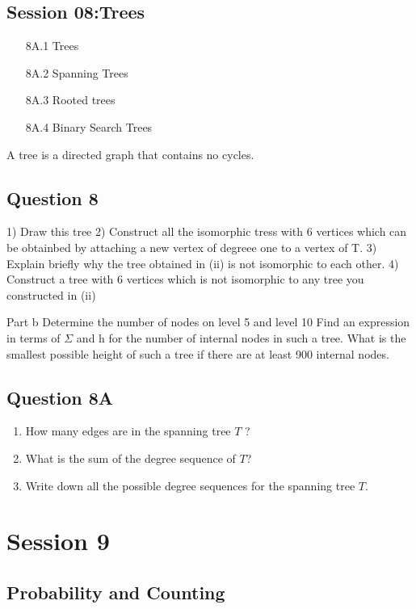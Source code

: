\documentclass[]{report}
\begin{document}
				\section*{Session 08:Trees}
				\begin{itemize}
					\item[8A.1] Trees
					\item[8A.2] Spanning Trees
					\item[8A.3] Rooted trees
					\item[8A.4] Binary Search Trees
				\end{itemize}
				A tree is a directed graph that contains no cycles.
\section{Question 8}

1) Draw this tree
2) Construct all the isomorphic tress with 6 vertices which can be obtainbed by attaching a new vertex of degreee one to a vertex of T.
3) Explain briefly why the tree obtained in (ii) is not isomorphic to each other.
4) Construct a tree with 6 vertices which is not isomorphic to any tree you constructed in (ii)

Part b
Determine the number of nodes on level 5 and level 10
Find an expression in terms of $\Sigma$ and h for the number of internal nodes in such a tree.
What is the smallest possible height of such a tree if there are at least 900 internal nodes.


\section{Question 8A}
\begin{enumerate}
	\item How many edges are in the spanning tree $T$ ?
	\item What is the sum of the degree sequence of $T$?
	\item Write down all the possible degree sequences for the spanning tree $T$.
\end{enumerate}
\chapter{Session 9}
\section{Probability and Counting}
\end{document}
